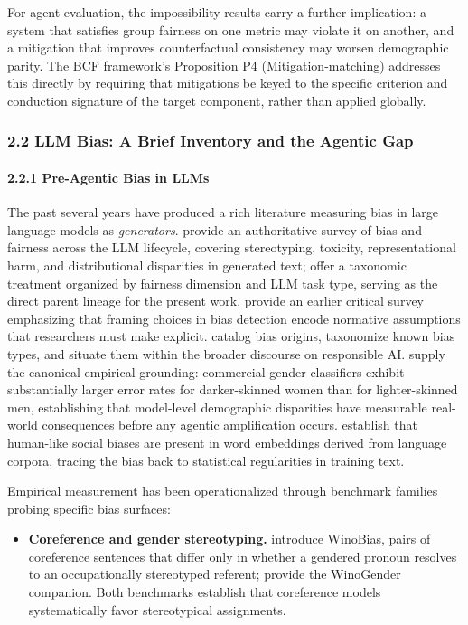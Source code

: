 \documentclass[10pt]{article}
\begin{document}
For agent evaluation, the impossibility results carry a further implication: a system that satisfies group fairness on one metric may violate it on another, and a mitigation that improves counterfactual consistency may worsen demographic parity. The BCF framework's Proposition P4 (Mitigation-matching) addresses this directly by requiring that mitigations be keyed to the specific criterion and conduction signature of the target component, rather than applied globally.


\subsubsection*{2.2 LLM Bias: A Brief Inventory and the Agentic Gap}

\paragraph*{2.2.1 Pre-Agentic Bias in LLMs}

The past several years have produced a rich literature measuring bias in large language models as \emph{generators}. \cite{gallegos2024bias} provide an authoritative survey of bias and fairness across the LLM lifecycle, covering stereotyping, toxicity, representational harm, and distributional disparities in generated text; \cite{chu2024fairness} offer a taxonomic treatment organized by fairness dimension and LLM task type, serving as the direct parent lineage for the present work. \cite{blodgett2020language} provide an earlier critical survey emphasizing that framing choices in bias detection encode normative assumptions that researchers must make explicit. \cite{navigli2023biases} catalog bias origins, taxonomize known bias types, and situate them within the broader discourse on responsible AI. \cite{buolamwini2018gender} supply the canonical empirical grounding: commercial gender classifiers exhibit substantially larger error rates for darker-skinned women than for lighter-skinned men, establishing that model-level demographic disparities have measurable real-world consequences before any agentic amplification occurs. \cite{caliskan2017semantics} establish that human-like social biases are present in word embeddings derived from language corpora, tracing the bias back to statistical regularities in training text.

Empirical measurement has been operationalized through benchmark families probing specific bias surfaces:

\begin{itemize}
\item \textbf{Coreference and gender stereotyping.} \cite{zhao2018gender} introduce WinoBias, pairs of coreference sentences that differ only in whether a gendered pronoun resolves to an occupationally stereotyped referent; \cite{rudinger2018gender} provide the WinoGender companion. Both benchmarks establish that coreference models systematically favor stereotypical assignments.
\end{itemize}
\end{document}
